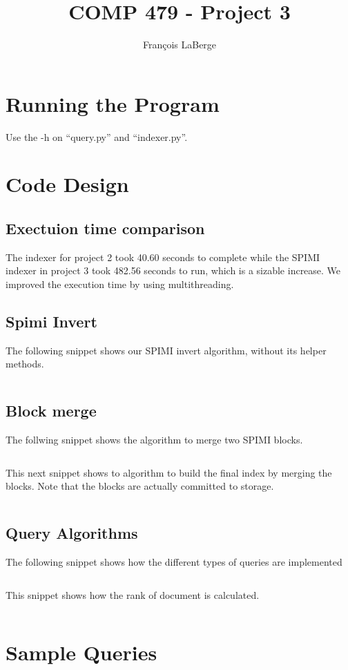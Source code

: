 \documentclass[]{article}
\title{COMP 479 - Project 3}
\author{François LaBerge}
\begin{document}
\maketitle

\section{Running the Program}
Use the -h on ``query.py'' and ``indexer.py''.

\section{Code Design}
   \subsection{Exectuion time comparison}
   The indexer for project 2 took  40.60 seconds to complete while the SPIMI indexer in project 3 took 482.56 seconds to run, which is a sizable increase. We improved the execution time by using multithreading.
   \subsection{Spimi Invert}
   The following snippet shows our SPIMI invert algorithm, without its helper methods.
   \inputminted[]{python}{snip/spimi.txt}

   \subsection{Block merge}
   The follwing snippet shows the algorithm to merge two SPIMI blocks.
   \inputminted[]{python}{snip/merge_block.txt}

   This next snippet shows to algorithm to build the final index by merging the blocks. Note that the blocks are actually committed to storage.
   \inputminted[]{python}{snip/final_index.txt}

   \subsection{Query Algorithms}
   The following snippet shows how the different types of queries are implemented
   \inputminted[]{python}{snip/query.txt}

   This snippet shows how the rank of document is calculated.
   \inputminted[]{python}{snip/rank.txt}

\section{Sample Queries}
\end{document}
